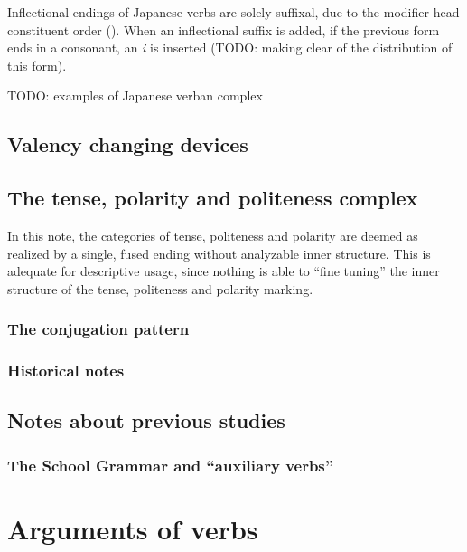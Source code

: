 \documentclass[UTF8, a4paper, oneside, scheme=plain]{ctexrep}
\newcommand{\corpus}[1]{\emph{#1}}
\begin{document}
Inflectional endings of Japanese verbs are solely suffixal, 
due to the modifier-head constituent order ().
When an inflectional suffix is added,
if the previous form ends in a consonant,
an \corpus{i} is inserted (TODO: making clear of the distribution of this form).

\begin{exe}
    \ex TODO: examples of Japanese verban complex
\end{exe}

\section{Valency changing devices}

\section{The tense, polarity and politeness complex}\label{sec:tense-polarity-polite}

In this note,
the categories of tense, politeness and polarity 
are deemed as realized by a single, fused ending without analyzable inner structure.
This is adequate for descriptive usage,
since nothing is able to ``fine tuning'' the inner structure of the 
tense, politeness and polarity marking.

\subsection{The conjugation pattern}\label{sec:final-conjugation-pattern}



\subsection{Historical notes}

\section{Notes about previous studies}\label{sec:verb-complex-previous}

\subsection{The School Grammar and ``auxiliary verbs''}\label{sec:so-called-auxiliary-verb}



\chapter{Arguments of verbs}
\end{document}
